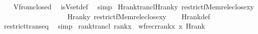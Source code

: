 \begin{isabellebody}
%
\isadelimproof
\ \ %
\endisadelimproof
%
\isatagproof
{}\isamarkupfalse%
\ Vfrom{\isacharunderscore}{\kern0pt}closed\ \isamarkupfalse%
\ is{\isacharunderscore}{\kern0pt}Vset{\isacharunderscore}{\kern0pt}def\ \isamarkupfalse%
\ simp%
\endisatagproof
{\isafoldproof}%
%
\isadelimproof
\isanewline
%
\endisadelimproof
\isanewline
{}\isamarkupfalse%
\ Hrank{\isacharunderscore}{\kern0pt}trancl{\isacharcolon}{\kern0pt}{\isachardoublequoteopen}Hrank{\isacharparenleft}{\kern0pt}y{\isacharcomma}{\kern0pt}\ restrict{\isacharparenleft}{\kern0pt}f{\isacharcomma}{\kern0pt}Memrel{\isacharparenleft}{\kern0pt}eclose{\isacharparenleft}{\kern0pt}{\isacharbraceleft}{\kern0pt}x{\isacharbraceright}{\kern0pt}{\isacharparenright}{\kern0pt}{\isacharparenright}{\kern0pt}{\isacharminus}{\kern0pt}{\isacharbackquote}{\kern0pt}{\isacharbackquote}{\kern0pt}{\isacharbraceleft}{\kern0pt}y{\isacharbraceright}{\kern0pt}{\isacharparenright}{\kern0pt}{\isacharparenright}{\kern0pt}\isanewline
\ \ \ \ \ \ \ \ \ \ \ \ \ \ \ \ \ \ {\isacharequal}{\kern0pt}\ Hrank{\isacharparenleft}{\kern0pt}y{\isacharcomma}{\kern0pt}\ restrict{\isacharparenleft}{\kern0pt}f{\isacharcomma}{\kern0pt}{\isacharparenleft}{\kern0pt}Memrel{\isacharparenleft}{\kern0pt}eclose{\isacharparenleft}{\kern0pt}{\isacharbraceleft}{\kern0pt}x{\isacharbraceright}{\kern0pt}{\isacharparenright}{\kern0pt}{\isacharparenright}{\kern0pt}{\isacharcircum}{\kern0pt}{\isacharplus}{\kern0pt}{\isacharparenright}{\kern0pt}{\isacharminus}{\kern0pt}{\isacharbackquote}{\kern0pt}{\isacharbackquote}{\kern0pt}{\isacharbraceleft}{\kern0pt}y{\isacharbraceright}{\kern0pt}{\isacharparenright}{\kern0pt}{\isacharparenright}{\kern0pt}{\isachardoublequoteclose}\isanewline
%
\isadelimproof
\ \ %
\endisadelimproof
%
\isatagproof
{}\isamarkupfalse%
\ Hrank{\isacharunderscore}{\kern0pt}def\isanewline
\ \ \isamarkupfalse%
\ restrict{\isacharunderscore}{\kern0pt}trans{\isacharunderscore}{\kern0pt}eq\ \isamarkupfalse%
\ simp%
\endisatagproof
{\isafoldproof}%
%
\isadelimproof
\isanewline
%
\endisadelimproof
\isanewline
{}\isamarkupfalse%
\ rank{\isacharunderscore}{\kern0pt}trancl{\isacharcolon}{\kern0pt}\ {\isachardoublequoteopen}rank{\isacharparenleft}{\kern0pt}x{\isacharparenright}{\kern0pt}\ {\isacharequal}{\kern0pt}\ wfrec{\isacharparenleft}{\kern0pt}rrank{\isacharparenleft}{\kern0pt}x{\isacharparenright}{\kern0pt}{\isacharcomma}{\kern0pt}\ x{\isacharcomma}{\kern0pt}\ Hrank{\isacharparenright}{\kern0pt}{\isachardoublequoteclose}\isanewline

\end{isabellebody}
